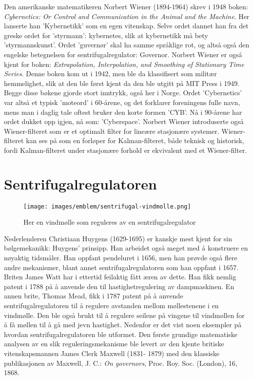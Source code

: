 Den amerikanske matematikeren Norbert Wiener (1894-1964) skrev i 1948 boken: \textit{Cybernetics: Or Control and Communication in the Animal and the Machine}. Her lanserte han 'Kybernetikk' som en egen vitenskap. Selve ordet dannet han fra det greske ordet for 'styrmann': kybernetes, slik at kybernetikk må bety 'styrmannskunst'. Ordet 'guvernør' skal ha samme språklige rot, og altså også den engelske betegnelsen for sentrifugalregulator: Governor. Norbert Wiener er også kjent for boken: \textit{Extrapolation, Interpolation, and Smoothing of Stationary Time Series}. Denne boken kom ut i 1942, men ble da klassifisert som militær hemmelighet, slik at den ble først kjent da den ble utgitt på MIT Press i 1949. Begge disse bøkene gjorde stort inntrykk, også her i Norge. Ordet 'Cybernetics' var altså et typisk 'moteord' i 60-årene, og det forklarer foreningens fulle navn, mens man i daglig tale oftest bruker den korte formen 'CYB'. Nå i 90-årene har ordet dukket opp igjen, nå som: 'Cyberspace'. Norbert Wiener introduserte også Wiener-filteret som er et optimalt filter for lineære stasjonære systemer. Wiener-filteret kan ses på som en forløper for Kalman-filteret, både teknisk og historisk, fordi Kalman-filteret under stasjonære forhold er ekvivalent med et Wiener-filter.

\section{Sentrifugalregulatoren}

\begin{wrapfigure}{l}{7cm}
	\vspace{-20pt}
	\centering
	\texttt{[image: images/emblem/sentrifugal-vindmolle.png]}
	\label{fig:sentrifugal-vindmolle}
	\caption{Her en vindmølle som reguleres av en sentrifugalregulator}
\end{wrapfigure}

Nederlenderen Christiaan Huygens (1629-1695) er kanskje mest kjent for sin bølgemekanikk: Huygens' prinsipp. Han arbeidet også meget med å konstruere en nøyaktig tidsmåler. Han oppfant pendeluret i 1656, men han prøvde også flere andre mekanismer, blant annet sentrifugalregulatoren som han oppfant i 1657. Briten James Watt har i ettertid feilaktig fått æren av dette. Han fikk nemlig patent i 1788 på å anvende den til hastighetregulering av dampmaskinen. En annen brite, Thomas Mead, fikk i 1787 patent på å anvende sentrifugalregulatoren til å regulere avstanden mellom møllestenene i en vindmølle. Den ble også brukt til å regulere seilene på vingene til vindmøllen for å få møllen til å gå med jevn hastighet. Nedenfor er det vist noen eksempler på hvordan sentrifugalregulatoren ble utformet. Den første grundige matematiske analysen av en slik reguleringsmekanisme ble levert av den kjente britiske vitenskapsmannen James Clerk Maxwell (1831- 1879) med den klassiske publikasjonen av Maxwell, J. C.: \textit{On governors}, Proc. Roy. Soc. (London), 16, 1868.

